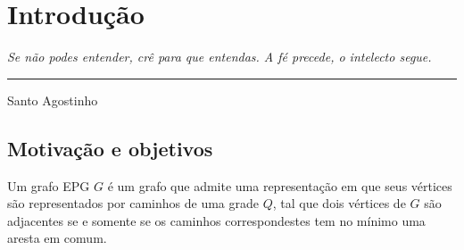 \chapter{Introdução}

\begin{flushright}
\begin{minipage}[t][0cm][b]{0.47\textwidth}
\emph{Se não podes entender, crê para que entendas. A fé precede, o intelecto segue.}
\end{minipage}

\rule[0cm]{7cm}{0.03cm}%

Santo Agostinho
\end{flushright}


\section{Motivação e objetivos}

Um grafo EPG $G$ é um grafo que admite uma representação em que seus vértices são representados por caminhos de uma grade $Q$, tal que dois vértices de $G$ são adjacentes se e somente se os caminhos correspondestes tem no mínimo uma aresta em comum.



